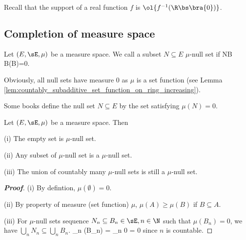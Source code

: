 \begin{remark}
Recall that the support of a real function $f$ is $\ol{f^{-1}(\R\bs\bra{0})}$.
\end{remark}


\subsection{Completion of measure space}



\begin{definition}\label{def:null_set_measure}
Let $(E,\sE,\mu)$ be a measure space. We call a subset $N\subseteq E$ $\mu$-null set if %
\be
N\subseteq B B\in\sE {}\mu(B)=0.
\ee
\end{definition}

\begin{remark}
Obviously, all null sets have measure 0 as $\mu$ is a set function (see Lemma \ref{lem:countably_subadditive_set_function_on_ring_increasing}).

Some books define the null set $N\subseteq E$ by the set satisfying $\mu(N)= 0$.
\end{remark}


\begin{lemma}\label{lem:null_set_property}
Let $(E,\sE,\mu)$ be a measure space. Then
\ben
\item [(i)] The empty set is $\mu$-null set.
\item [(ii)] Any subset of $\mu$-null set is a $\mu$-null set.
\item [(iii)] The union of countably many $\mu$-null sets is still a $\mu$-null set.
\een
\end{lemma}

\begin{proof}[\bf Proof]
\ben
\item [(i)] By defintion, $\mu(\emptyset) = 0$.
\item [(ii)] By property of measure (set function) $\mu$, $\mu(A) \geq\mu(B)$ if $B\subseteq A$.
\item [(iii)] For $\mu$-null sets sequence $N_n\subseteq B_n\in \sE, n\in \N$ such that $\mu(B_n) = 0$, we have $\bigcup_n N_n \subseteq \bigcup_n B_n$.
\be
\mu{} \leq \mu{}  \leq \sum_n \mu(B_n) = \sum_n 0 = 0
\ee
since $n$ is countable.
\een
\end{proof}

